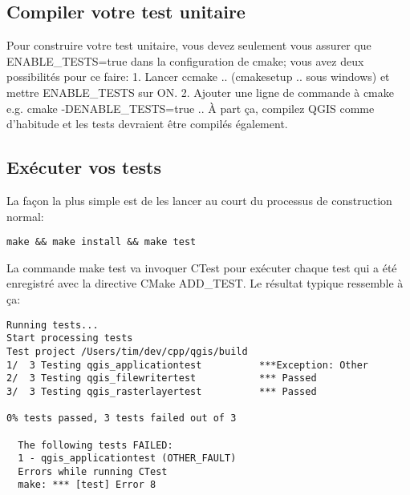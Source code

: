 \subsection{Compiler votre test unitaire}
Pour construire votre test unitaire, vous devez seulement vous assurer que ENABLE\_TESTS=true dans la configuration de cmake; vous avez deux possibilités pour ce faire:
 1. Lancer ccmake .. (cmakesetup .. sous windows) et mettre ENABLE\_TESTS sur ON.
 2. Ajouter une ligne de commande à cmake e.g. cmake -DENABLE\_TESTS=true ..
À part ça, compilez QGIS comme d'habitude et les tests devraient être compilés également.

\subsection{Exécuter vos tests}
La façon la plus simple est de les lancer au court du processus de construction normal:

\begin{verbatim}
make && make install && make test
\end{verbatim}

La commande make test va invoquer CTest pour exécuter chaque test qui a été enregistré avec la directive CMake ADD\_TEST. Le résultat typique ressemble à ça:

\begin{verbatim}
Running tests...
Start processing tests
Test project /Users/tim/dev/cpp/qgis/build
1/  3 Testing qgis_applicationtest          ***Exception: Other
2/  3 Testing qgis_filewritertest           *** Passed
3/  3 Testing qgis_rasterlayertest          *** Passed

0% tests passed, 3 tests failed out of 3

  The following tests FAILED:
  1 - qgis_applicationtest (OTHER_FAULT)
  Errors while running CTest
  make: *** [test] Error 8
\end{verbatim}

